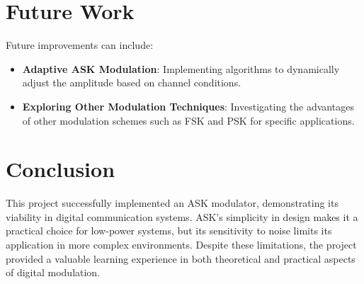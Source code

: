\documentclass[12pt,a4paper]{article}
\begin{document}
\section*{Future Work}
Future improvements can include:
\begin{itemize}
    \item \textbf{Adaptive ASK Modulation}: Implementing algorithms to dynamically adjust the amplitude based on channel conditions.
    \item \textbf{Exploring Other Modulation Techniques}: Investigating the advantages of other modulation schemes such as FSK and PSK for specific applications.
\end{itemize}


\section*{Conclusion}
This project successfully implemented an ASK modulator, demonstrating its viability in digital communication systems. ASK’s simplicity in design makes it a practical choice for low-power systems, but its sensitivity to noise limits its application in more complex environments. Despite these limitations, the project provided a valuable learning experience in both theoretical and practical aspects of digital modulation.
\end{document}
